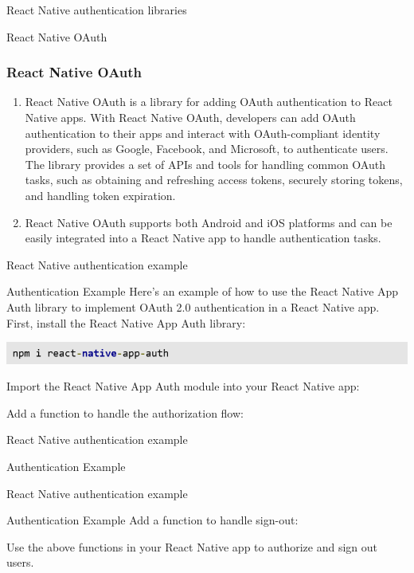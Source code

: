 \documentclass[10pt]{beamer}
\begin{document}
\begin{frame}{React Native authentication libraries}
\begin{block}{React Native OAuth}
\subsubsection{React Native OAuth}
\begin{enumerate}
\item[\ding{242}]React Native OAuth is a library for adding OAuth authentication to React Native apps. With React Native OAuth, developers can add OAuth authentication to their apps and interact with OAuth-compliant identity providers, such as Google, Facebook, and Microsoft, to authenticate users. The library provides a set of APIs and tools for handling common OAuth tasks, such as obtaining and refreshing access tokens, securely storing tokens, and handling token expiration.
\item[\ding{242}]React Native OAuth supports both Android and iOS platforms and can be easily integrated into a React Native app to handle authentication tasks.
\end{enumerate}
\end{block}
\end{frame}

\begin{frame}{React Native authentication example }
\begin{block}{Authentication Example}
Here's an example of how to use the React Native App Auth library to implement OAuth 2.0 authentication in a React Native app.\\
First, install the React Native App Auth library:
\begin{center}
\includegraphics[scale=.5]{3.png}
\end{center}
Import the React Native App Auth module into your React Native app:

\end{block}
Add a function to handle the authorization flow:
\end{frame}

\begin{frame}{React Native authentication example}
\begin{block}{Authentication Example}


\end{block}

\end{frame}
\begin{frame}{React Native authentication example}
\begin{block}{Authentication Example}
Add a function to handle sign-out:

Use the above functions in your React Native app to authorize and sign out users.

\end{block}

\end{frame}
\end{document}
